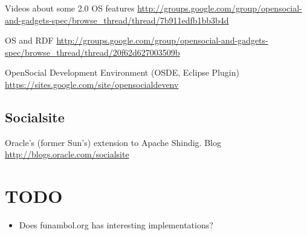 \documentclass[12pt,a4paper]{scrartcl}		%
\begin{document}
Videos about some 2.0 OS features \url{http://groups.google.com/group/opensocial-and-gadgets-spec/browse_thread/thread/7b911edfb1bb3b4d}

OS and RDF \url{http://groups.google.com/group/opensocial-and-gadgets-spec/browse_thread/thread/20f62d627003509b}

OpenSocial Development Environment (OSDE, Eclipse Plugin)  \url{https://sites.google.com/site/opensocialdevenv}

\subsection{Socialsite}

Oracle's (former Sun's) extension to Apache Shindig. Blog \url{http://blogs.oracle.com/socialsite}

\section{TODO}
\begin{itemize}
\item Does funambol.org has interesting implementations?
\end{itemize}


{}

\end{document}
